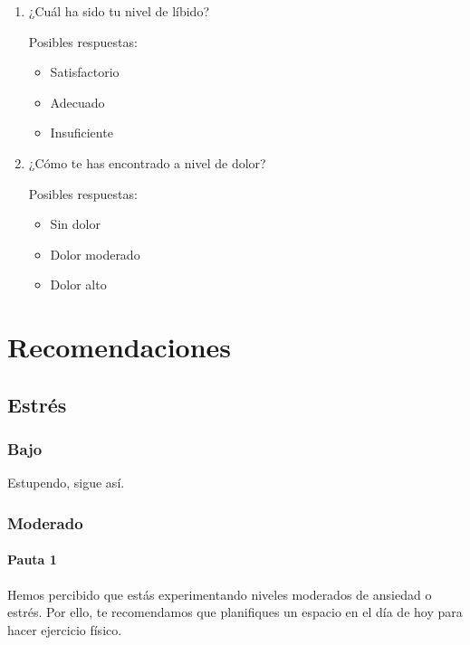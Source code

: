 \begin{enumerate}
                \item ¿Cuál ha sido tu nivel de líbido?
                
                Posibles respuestas:
                    \begin{itemize}
                        \item Satisfactorio  
                        \item Adecuado
                        \item Insuficiente
                    \end{itemize}
                    
                \item ¿Cómo te has encontrado a nivel de dolor?
                
                Posibles respuestas:
                    \begin{itemize}
                        \item Sin dolor 
                        \item Dolor moderado
                        \item Dolor alto
                    \end{itemize}
                    
            \end{enumerate}
\chapter{Recomendaciones}
\label{chapter:recomendaciones}

    \section{Estrés}
        \subsection{Bajo}
            Estupendo, sigue así. 
        \subsection{Moderado}
            \subsubsection{Pauta 1}
                Hemos percibido que estás experimentando niveles moderados de ansiedad o estrés. 
                Por ello, te recomendamos que planifiques un espacio en el día de hoy para hacer ejercicio físico.

